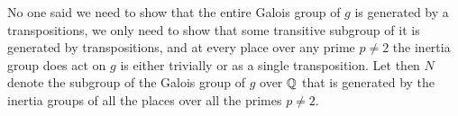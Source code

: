 \documentclass[../../main.tex]{subfiles}
\begin{document}
No one said we need to show that the entire Galois group of $g$ is generated by a transpositions, we only need to show that some transitive subgroup of it is generated by transpositions, and at every place over any prime $p \neq 2$ the inertia group does act on $g$ is either trivially or as a single transposition.  
Let then $N$ denote the subgroup of the Galois group of $g$ over $\mathbb{Q}$ that is generated by the inertia groups of all the places over all the primes $p \neq 2$.












\end{document}
